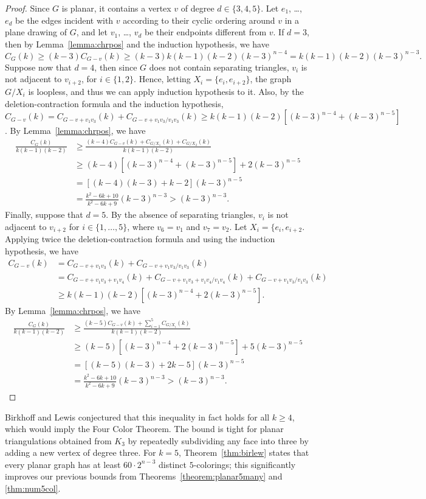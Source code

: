 \documentclass[12pt,twoside,openright,a4paper]{book}
\begin{document}
\begin{proof}
Since $G$ is planar, it contains a vertex $v$ of degree $d\in\{3,4,5\}$.  Let $e_1$, \ldots, $e_d$
be the edges incident with $v$ according to their cyclic ordering around $v$ in a plane drawing of $G$,
and let $v_1$, \ldots, $v_d$ be their endpoints different from $v$.
If $d=3$,
then by Lemma~\ref{lemma:chrpos} and the induction hypothesis, we have
$$C_G(k)\ge (k-3)C_{G-v}(k)\ge (k-3)k(k-1)(k-2)(k-3)^{n-4}=k(k-1)(k-2)(k-3)^{n-3}.$$
Suppose now that $d=4$, then since $G$ does not contain separating triangles, $v_i$ is not adjacent to $v_{i+2}$,
for $i\in\{1,2\}$.  Hence, letting $X_i=\{e_i,e_{i+2}\}$, the graph $G/X_i$ is loopless, and thus we can
apply induction hypothesis to it.  Also, by the deletion-contraction formula and the induction hypothesis,
$C_{G-v}(k)=C_{G-v+v_1v_3}(k)+C_{G-v+v_1v_3/v_1v_3}(k)\ge k(k-1)(k-2)[(k-3)^{n-4}+(k-3)^{n-5}]$.
By Lemma~\ref{lemma:chrpos}, we have
\begin{align*}
\frac{C_G(k)}{k(k-1)(k-2)}&\ge \frac{(k-4)C_{G-v}(k)+C_{G/X_1}(k)+C_{G/X_2}(k)}{k(k-1)(k-2)}\\
&\ge (k-4)[(k-3)^{n-4}+(k-3)^{n-5}]+2(k-3)^{n-5}\\
&=[(k-4)(k-3)+k-2](k-3)^{n-5}\\
&=\frac{k^2-6k+10}{k^2-6k+9}(k-3)^{n-3}>(k-3)^{n-3}.
\end{align*}
Finally, suppose that $d=5$.  By the absence of separating triangles, $v_i$ is not adjacent to $v_{i+2}$
for $i\in\{1,\ldots,5\}$, where $v_6=v_1$ and $v_7=v_2$.  Let $X_i=\{e_i,e_{i+2}$.
Applying twice the deletion-contraction formula and using the induction hypothesis,
we have
\begin{align*}
C_{G-v}(k)&=C_{G-v+v_1v_3}(k)+C_{G-v+v_1v_3/v_1v_3}(k)\\
&=C_{G-v+v_1v_3+v_1v_4}(k)+C_{G-v+v_1v_3+v_1v_4/v_1v_4}(k)+C_{G-v+v_1v_3/v_1v_3}(k)\\
&\ge k(k-1)(k-2)[(k-3)^{n-4}+2(k-3)^{n-5}].
\end{align*}
By Lemma~\ref{lemma:chrpos}, we have
\begin{align*}
\frac{C_G(k)}{k(k-1)(k-2)}&\ge \frac{(k-5)C_{G-v}(k)+\sum_{i=1}^5C_{G/X_i}(k)}{k(k-1)(k-2)}\\
&\ge (k-5)[(k-3)^{n-4}+2(k-3)^{n-5}]+5(k-3)^{n-5}\\
&=[(k-5)(k-3)+2k-5](k-3)^{n-5}\\
&=\frac{k^2-6k+10}{k^2-6k+9}(k-3)^{n-3}>(k-3)^{n-3}.
\end{align*}
\end{proof}
Birkhoff and Lewis conjectured that this inequality in fact holds for all $k\ge 4$, which would imply the Four Color Theorem.
The bound is tight for planar triangulations obtained from $K_3$ by repeatedly subdividing any face into three by adding a new vertex
of degree three.  For $k=5$, Theorem~\ref{thm:birlew} states that every planar graph has at least $60\cdot 2^{n-3}$ distinct $5$-colorings;
this significantly improves our previous bounds from Theorems~\ref{theorem:planar5many} and \ref{thm:num5col}.
\end{document}
